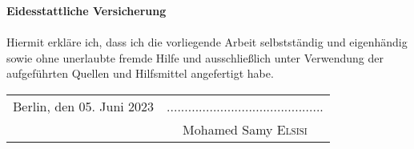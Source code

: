 \begin{titlepage}
\vspace*{5.0cm}
\large{\bf Eidesstattliche Versicherung}\\
\\
Hiermit erkl\"are ich, dass ich die vorliegende Arbeit selbstst\"andig und eigenh\"andig sowie ohne unerlaubte fremde Hilfe und ausschlie\ss lich unter Verwendung der aufgef\"uhrten Quellen und Hilfsmittel angefertigt habe.
\vspace*{1cm}
~\\
\begin{tabular}{lc}
      \vspace*{0.1cm}
      \noindent Berlin, den 05. Juni 2023 & \noindent ............................................ \\
      \vspace*{0.1cm}
					      & \noindent \large{Mohamed Samy \textsc{Elsisi}}
\end{tabular}


\end{titlepage}
\sloppy

\titlepage
